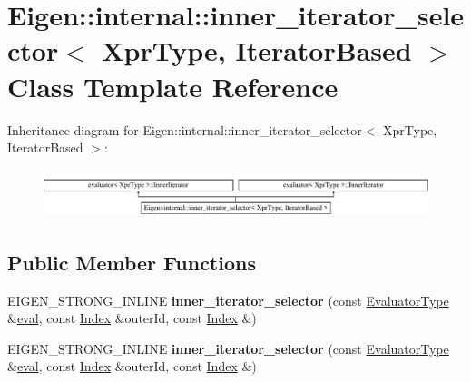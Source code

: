 \hypertarget{class_eigen_1_1internal_1_1inner__iterator__selector_3_01_xpr_type_00_01_iterator_based_01_4}{}\section{Eigen\+:\+:internal\+:\+:inner\+\_\+iterator\+\_\+selector$<$ Xpr\+Type, Iterator\+Based $>$ Class Template Reference}
\label{class_eigen_1_1internal_1_1inner__iterator__selector_3_01_xpr_type_00_01_iterator_based_01_4}
Inheritance diagram for Eigen\+:\+:internal\+:\+:inner\+\_\+iterator\+\_\+selector$<$ Xpr\+Type, Iterator\+Based $>$\+:\begin{figure}[H]
\begin{center}
\leavevmode
\includegraphics[height=1.432225cm]{class_eigen_1_1internal_1_1inner__iterator__selector_3_01_xpr_type_00_01_iterator_based_01_4}
\end{center}
\end{figure}
\subsection*{Public Member Functions}
\begin{DoxyCompactItemize}
\item 
\mbox{\label{class_eigen_1_1internal_1_1inner__iterator__selector_3_01_xpr_type_00_01_iterator_based_01_4_a1dfaba22f39c3560fb588d35f940a540}} 
E\+I\+G\+E\+N\+\_\+\+S\+T\+R\+O\+N\+G\+\_\+\+I\+N\+L\+I\+NE {\bfseries inner\+\_\+iterator\+\_\+selector} (const \hyperlink{struct_eigen_1_1internal_1_1evaluator}{Evaluator\+Type} \&\hyperlink{struct_eigen_1_1internal_1_1eval}{eval}, const \hyperlink{namespace_eigen_a62e77e0933482dafde8fe197d9a2cfde}{Index} \&outer\+Id, const \hyperlink{namespace_eigen_a62e77e0933482dafde8fe197d9a2cfde}{Index} \&)
\item 
\mbox{\label{class_eigen_1_1internal_1_1inner__iterator__selector_3_01_xpr_type_00_01_iterator_based_01_4_a1dfaba22f39c3560fb588d35f940a540}} 
E\+I\+G\+E\+N\+\_\+\+S\+T\+R\+O\+N\+G\+\_\+\+I\+N\+L\+I\+NE {\bfseries inner\+\_\+iterator\+\_\+selector} (const \hyperlink{struct_eigen_1_1internal_1_1evaluator}{Evaluator\+Type} \&\hyperlink{struct_eigen_1_1internal_1_1eval}{eval}, const \hyperlink{namespace_eigen_a62e77e0933482dafde8fe197d9a2cfde}{Index} \&outer\+Id, const \hyperlink{namespace_eigen_a62e77e0933482dafde8fe197d9a2cfde}{Index} \&)
\end{DoxyCompactItemize}
